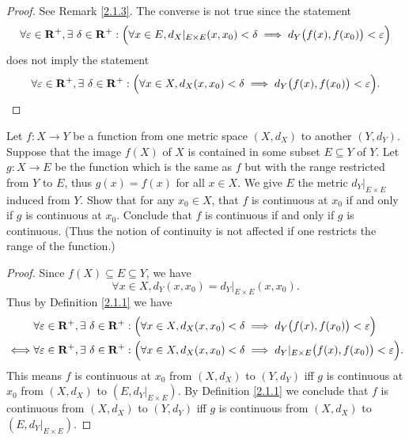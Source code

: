 \begin{proof}
    See Remark \ref{2.1.3}.
    The converse is not true since the statement
    \[
        \forall \varepsilon \in \mathbf{R}^+, \exists\ \delta \in \mathbf{R}^+ : \Big(\forall x \in E, d_X|_{E \times E}(x, x_0) < \delta \implies d_Y\big(f(x), f(x_0)\big) < \varepsilon\Big)
    \]
    does not imply the statement
    \[
        \forall \varepsilon \in \mathbf{R}^+, \exists\ \delta \in \mathbf{R}^+ : \Big(\forall x \in X, d_X(x, x_0) < \delta \implies d_Y\big(f(x), f(x_0)\big) < \varepsilon\Big).
    \]
\end{proof}

\begin{exercise}\label{ex 2.1.7}
    Let \(f : X \to Y\) be a function from one metric space \((X, d_X)\) to another \((Y, d_Y)\).
    Suppose that the image \(f(X)\) of \(X\) is contained in some subset \(E \subseteq Y\) of \(Y\).
    Let \(g : X \to E\) be the function which is the same as \(f\) but with the range restricted from \(Y\) to \(E\), thus \(g(x) = f(x)\) for all \(x \in X\).
    We give \(E\) the metric \(d_Y|_{E \times E}\) induced from \(Y\).
    Show that for any \(x_0 \in X\), that \(f\) is continuous at \(x_0\) if and only if \(g\) is continuous at \(x_0\).
    Conclude that \(f\) is continuous if and only if \(g\) is continuous.
    (Thus the notion of continuity is not affected if one restricts the range of the function.)
\end{exercise}

\begin{proof}
    Since \(f(X) \subseteq E \subseteq Y\), we have
    \[
        \forall x \in X, d_Y(x, x_0) = d_Y|_{E \times E}(x, x_0).
    \]
    Thus by Definition \ref{2.1.1} we have
    \begin{align*}
             & \forall \varepsilon \in \mathbf{R}^+, \exists\ \delta \in \mathbf{R}^+ : \Big(\forall x \in X, d_X(x, x_0) < \delta \implies d_Y\big(f(x), f(x_0)\big) < \varepsilon\Big)                \\
        \iff & \forall \varepsilon \in \mathbf{R}^+, \exists\ \delta \in \mathbf{R}^+ : \Big(\forall x \in X, d_X(x, x_0) < \delta \implies d_Y|_{E \times E}\big(f(x), f(x_0)\big) < \varepsilon\Big).
    \end{align*}
    This means \(f\) is continuous at \(x_0\) from \((X, d_X)\) to \((Y, d_Y)\) iff \(g\) is continuous at \(x_0\) from \((X, d_X)\) to \((E, d_Y|_{E \times E})\).
    By Definition \ref{2.1.1} we conclude that \(f\) is continuous from \((X, d_X)\) to \((Y, d_Y)\) iff \(g\) is continuous from \((X, d_X)\) to \((E, d_Y|_{E \times E})\).
\end{proof}